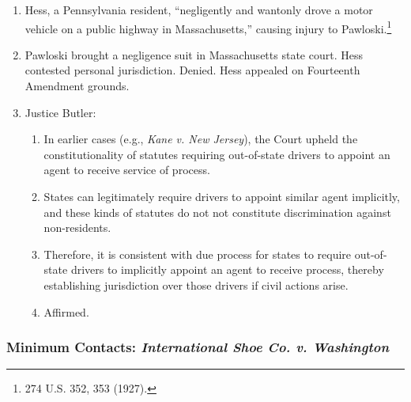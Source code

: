 \begin{enumerate}
    \item Hess, a Pennsylvania resident, ``negligently and wantonly drove a 
    motor vehicle on a public highway in Massachusetts,'' causing injury to 
    Pawloski.\footnote{274 U.S. 352, 353 (1927).}
    \item Pawloski brought a negligence suit in Massachusetts state court.  
    Hess contested personal jurisdiction. Denied. Hess appealed on Fourteenth 
    Amendment grounds.
    \item Justice Butler:
    \begin{enumerate}
        \item In earlier cases (e.g., \emph{Kane v. New Jersey}), the Court 
        upheld the constitutionality of statutes requiring out-of-state 
        drivers to appoint an agent to receive service of process.
        \item States can legitimately require drivers to appoint similar agent 
        implicitly, and these kinds of statutes do not not constitute 
        discrimination against non-residents.
        \item Therefore, it is consistent with due process for states to 
        require out-of-state drivers to implicitly appoint an agent to receive 
        process, thereby establishing jurisdiction over those drivers if civil 
        actions arise.
        \item Affirmed.
    \end{enumerate}
\end{enumerate}

\subsubsection{Minimum Contacts: \emph{International Shoe Co. v. Washington}}

